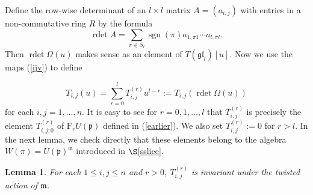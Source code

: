 \documentclass[twoside,12pt,reqno]{amsart}
\makeatletter
\newif\ifcenters@
\newtheorem{Lemma}[Proposition]{Lemma}
\def\rdet{\operatorname{rdet}}
\def\F{\mathrm{F}}
\def\sgn{{\operatorname{sgn}}}
\makeatother
\begin{document}
\iffalse
Define $\Omega(u)$
to be the following $l \times l$ matrix 
with entries in $T(\mathfrak{gl}_l)[u]$:
\begin{equation*}
\left(
\begin{array}{cccccc}
e_{1,1}+u-(l-1)n & e_{1,2} & e_{1,3}&\cdots & e_{1,l}\\
1&e_{2,2}+u-(l-2)n&&&\vdots\\
0&&\ddots&&e_{l-2,l}\\
\vdots&&1&e_{l-1,l-1} +u-n&e_{l-1,l}\\
0&\cdots&0&1&e_{l,l}  +u
\end{array}
\right).
\end{equation*}
\ifcenters@
This matrix should be compared with
(\ref{znr}).
Recalling the definitions (\ref{detdefr}) and (\ref{ijv}), define 
\else
Define the row-wise determinant of an $l \times l$ matrix $A = (a_{i,j})$ 
with entries in a non-commutative ring $R$ by the formula
\begin{equation}\label{detdefr}
\rdet A  = \sum_{\pi \in S_l} \sgn(\pi) a_{1,\pi
1} \cdots a_{l,\pi l}.
\end{equation}
Then $\rdet \Omega(u)$ makes sense as an element of 
$T(\mathfrak{gl}_l)[u]$.
Now we use the maps (\ref{ijv}) to
define 
\fi
\begin{equation}
T_{i,j}(u) = \sum_{r = 0}^l T_{i,j}^{(r)} u^{l-r}
:= T_{i,j}(\rdet \Omega(u))
\end{equation}
for each $i,j=1,\dots,n$.
It is easy to see for $r = 0,1,\dots,l$ that
$T_{i,j}^{(r)}$ is precisely the element
$T_{i,j;0}^{(r)}$ of $\F_r U(\mathfrak{p})$ defined in (\ref{earlier}).
We also set $T_{i,j}^{(r)} := 0$ for $r > l$.
In the next lemma, we 
check directly that these elements 
belong to the algebra $W(\pi)= U(\mathfrak{p})^{\mathfrak{m}}$
introduced in $\S$\ref{sslice}.

\begin{Lemma}\label{inv}
For each $1 \leq i,j \leq n$ and $r > 0$,
$T_{i,j}^{(r)}$ is invariant under the twisted action
of $\mathfrak{m}$.
\end{Lemma}
\end{document}

